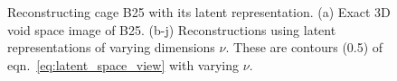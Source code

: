 \documentclass[journal=jacsat,manuscript=article,layout=traditional]{achemso}
\begin{document}
\begin{figure}
	\qquad
	\caption{Reconstructing cage B25 with its latent representation. (a) Exact 3D void space image of B25. (b-j) Reconstructions using latent representations of varying dimensions $\nu$. These are contours (0.5) of eqn.~\ref{eq:latent_space_view} with varying $\nu$.
	} \label{fig:cage_reconstruction}
\end{figure}
\end{document}
